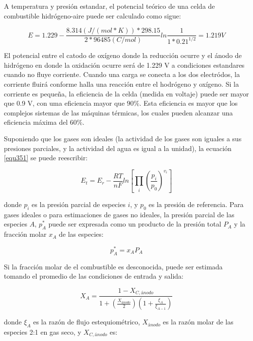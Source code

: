 \documentclass[12pt]{book}
\theoremstyle{definition}
\theoremstyle{remark}
\theoremstyle{plain}
\begin{document}
A temperatura y presión estandar, el potencial teórico de una celda de combustible 
hidrógeno-aire puede ser calculado como sigue:

\begin{equation}
 \label{equ353}
E=1.229 - \frac{8.314(J/(mol*K))*298.15}{2*96485(C/mol)}ln \frac{1}{1*0.21^{1/2}}=1.219 V
\end{equation}

El potencial entre el catodo de oxígeno donde la reducción ocurre y el ánodo de hidrógeno
en donde la oxidación ocurre será de 1.229 V a condiciones estandares cuando no fluye 
corriente. Cuando una carga se conecta a los dos electródos, la corriente fluirá 
conforme halla una reacción entre el hodrógeno y oxígeno. Si la corriente es
pequeña, la eficiencia de la celda (medida en voltaje) puede ser mayor que 0.9 V,
con uma eficiencia mayor que $90\%$. Esta eficiencia es mayor que los complejos 
sistemas de las máquinas térmicas, los cuales pueden alcanzar una eficiencia máxima
del $60\%$.

Suponiendo que los gases son ideales (la actividad de los gases son iguales a sus presiones
parciales, y la actividad del agua es igual a la unidad), la ecuación \ref{equ351} se 
puede reescribir:

\begin{equation}
 \label{equ354}
E_t = E_r -\frac{RT}{nF}ln [\prod_{\substack{i}}\left ( \frac{p_i}{p_0} \right )^{v_i}]
\end{equation}

donde $p_i$ es la presión parcial de especies $i$, y $p_0$ es la presión de 
referencia. Para gases ideales o para estimaciones de gases no ideales, la presión
parcial de las especies $A$, $p_A^*$ puede ser expresada como un producto de la 
presión total $P_A$ y la fracción molar $x_A$ de las especies:

\begin{equation}
 \label{equ356}
p_A^* = x_A P_A
\end{equation}

Si la fracción molar de el combustible es desconocida, puede ser estimada tomando 
el promedio de las condiciones de entrada y salida:

\begin{equation}
 \label{equ357}
X_A = \frac{1-X_{C, ánodo}}{1+\left( \frac{X_{ánodo}}{2} \right)\left(1+ \frac{\xi _{A}}{\xi_{A-1}} \right)}
\end{equation}

donde $\xi _{A}$ es la razón de flujo estequiométrico, $X_{ánodo}$ es la razón molar 
de las especies 2:1 en gas seco, y $X_{C, ánodo}$ es:
\end{document}

